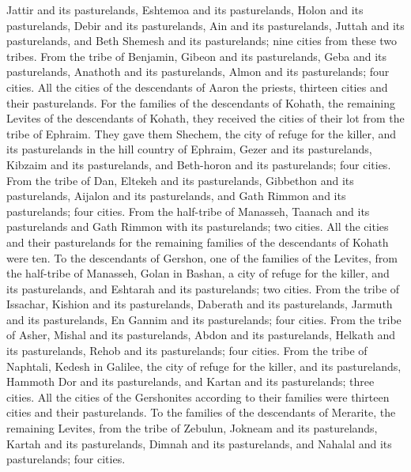 \begin{biblechapter}
\verse Jattir and its pasturelands, Eshtemoa and its pasturelands,
\verse Holon and its pasturelands, Debir and its pasturelands,
\verse Ain and its pasturelands, Juttah and its pasturelands, and Beth Shemesh and its pasturelands; nine cities from these two tribes.
\verse From the tribe of Benjamin, Gibeon and its pasturelands, Geba and its pasturelands,
\verse Anathoth and its pasturelands, Almon and its pasturelands; four cities.
\verse All the cities of the descendants of Aaron the priests, thirteen cities and their pasturelands.
\verse For the families of the descendants of Kohath, the remaining Levites of the descendants of Kohath, they received the cities of their lot from the tribe of Ephraim.
\verse They gave them Shechem, the city of refuge for the killer, and its pasturelands in the hill country of Ephraim, Gezer and its pasturelands,
\verse Kibzaim and its pasturelands, and Beth-horon and its pasturelands; four cities.
\verse From the tribe of Dan, Eltekeh and its pasturelands, Gibbethon and its pasturelands,
\verse Aijalon and its pasturelands, and Gath Rimmon and its pasturelands; four cities.
\verse From the half-tribe of Manasseh, Taanach and its pasturelands and Gath Rimmon with its pasturelands; two cities.
\verse All the cities and their pasturelands for the remaining families of the descendants of Kohath were ten.
\verse To the descendants of Gershon, one of the families of the Levites, from the half-tribe of Manasseh, Golan in Bashan, a city of refuge for the killer, and its pasturelands, and Eshtarah and its pasturelands; two cities.
\verse From the tribe of Issachar, Kishion and its pasturelands, Daberath and its pasturelands,
\verse Jarmuth and its pasturelands, En Gannim and its pasturelands; four cities.
\verse From the tribe of Asher, Mishal and its pasturelands, Abdon and its pasturelands,
\verse Helkath and its pasturelands, Rehob and its pasturelands; four cities.
\verse From the tribe of Naphtali, Kedesh in Galilee, the city of refuge for the killer, and its pasturelands, Hammoth Dor and its pasturelands, and Kartan and its pasturelands; three cities.
\verse All the cities of the Gershonites according to their families were thirteen cities and their pasturelands.
\verse To the families of the descendants of Merarite, the remaining Levites, from the tribe of Zebulun, Jokneam and its pasturelands, Kartah and its pasturelands,
\verse Dimnah and its pasturelands, and Nahalal and its pasturelands; four cities.

\end{biblechapter}

